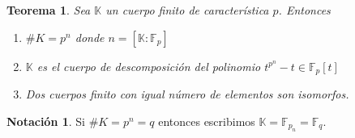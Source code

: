 \documentclass[10pt, spanish]{report}
\newtheorem*{tma}{Teorema}
\theoremstyle{definition}
\newtheorem*{notacion}{Notación}
\newcommand{\F}{\mathbb{F}}
\newcommand{\K}{\mathbb{K}}
\begin{document}
\begin{tma}
    Sea $\K$ un cuerpo finito de característica $p$. Entonces
    \begin{enumerate}
        \item $\#K=p^n$ donde $n=\left[ \K:\F_p \right]$
        \item $\K$ es el cuerpo de descomposición del polinomio
            $t^{p^n}-t\in\F_p[t]$  
        \item Dos cuerpos finito con igual número de elementos son isomorfos.
    \end{enumerate}
\end{tma}

\begin{notacion}
    Si $\#K=p^n=q$ entonces escribimos $\K=\F_{p_n}=\F_q$.
\end{notacion}
\end{document}
